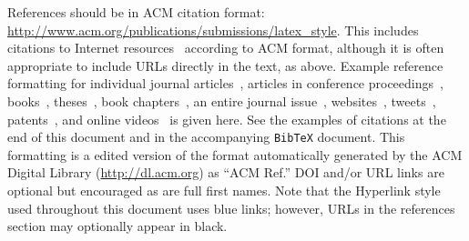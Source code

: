 \documentclass{sigchi}
\begin{document}
References should be in ACM citation format:
\url{http://www.acm.org/publications/submissions/latex_style}.  This
includes citations to Internet
resources~\cite{CHINOSAUR:venue,cavender:writing,psy:gangnam}
according to ACM format, although it is often appropriate to include
URLs directly in the text, as above. Example reference formatting for
individual journal articles~\cite{ethics}, articles in conference
proceedings~\cite{Klemmer:2002:WSC:503376.503378},
books~\cite{Schwartz:1995:GBF}, theses~\cite{sutherland:sketchpad},
book chapters~\cite{winner:politics}, an entire journal
issue~\cite{kaye:puc},
websites~\cite{acm_categories,cavender:writing},
tweets~\cite{CHINOSAUR:venue}, patents~\cite{heilig:sensorama}, and
online videos~\cite{psy:gangnam} is given here.  See the examples of
citations at the end of this document and in the accompanying
\texttt{BibTeX} document. This formatting is a edited version of the
format automatically generated by the ACM Digital Library
(\url{http://dl.acm.org}) as ``ACM Ref.'' DOI and/or URL links are
optional but encouraged as are full first names. Note that the
Hyperlink style used throughout this document uses blue links;
however, URLs in the references section may optionally appear in
black.

\balance{}



\end{document}
